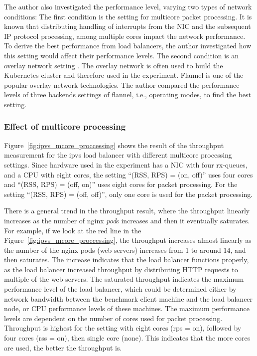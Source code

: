 The author also investigated the performance level, varying two types of network conditions:
The first condition is the setting for multicore packet processing.
It is known that distributing handling of interrupts from the NIC and the subsequent IP protocol processing, among multiple cores impact the network performance.
To derive the best performance from load balancers, the author investigated how this setting would affect their performance levels.
The second condition is an overlay network setting \cite{Sill2016,Marmol2015}.
The overlay network is often used to build the Kubernetes cluster and therefore used in the experiment.
Flannel \cite{CoreOSFlannel} is one of the popular overlay network technologies. 
The author compared the performance levels of three backends settings \cite{CoreOSFlannelBackend} of flannel, i.e., operating modes, to find the best setting.

\FloatBarrier

\subsubsection{Effect of multicore processing}

Figure~\ref{fig:ipvs_mcore_proccessing} shows the result of the throughput measurement for the ipvs load balancer with different multicore processing settings.
Since hardware used in the experiment has a NIC with four rx-queues, and a CPU with eight cores,
the setting \enquote{(RSS, RPS) = (on, off)} uses four cores and \enquote{(RSS, RPS) = (off, on)} uses eight cores for packet processing.
For the setting \enquote{(RSS, RPS) = (off, off)}, only one core is used for the packet processing.

There is a general trend in the throughput result, where the throughput linearly increases as the number of nginx {\em pod}s increases and then it eventually saturates.
For example, if we look at the red line in the Figure~\ref{fig:ipvs_mcore_proccessing}, the throughput increases almost linearly as the number of the nginx pods (web servers) increases from 1 to around 14, and then saturates.
The increase indicates that the load balancer functions properly, as the load balancer increased throughput by distributing HTTP requests to multiple of the web servers.
%
The saturated throughput indicates the maximum performance level of the load balancer, which could be determined either by network bandwidth between the benchmark client machine and the load balancer node, or CPU performance levels of these machines.
%
The maximum performance levels are dependent on the number of cores used for packet processing.
Throughput is highest for the setting with eight cores (rps = on), followed by four cores (rss = on), then single core (none).
This indicates that the more cores are used, the better the throughput is.

